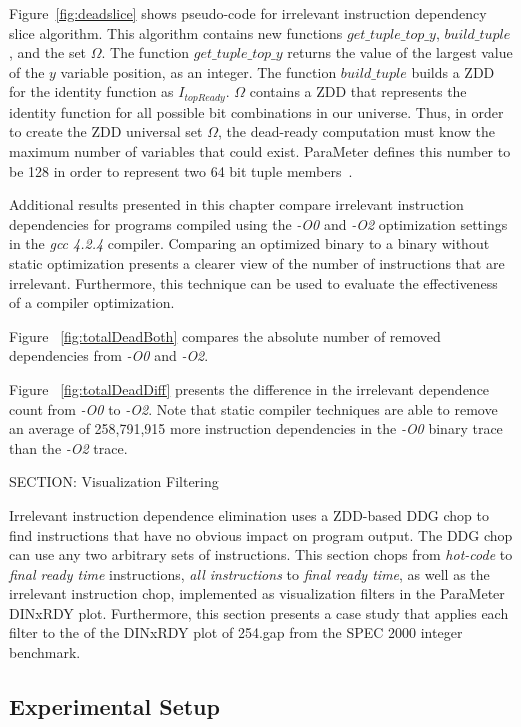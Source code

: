 {Figure~\ref{fig:deadslice} shows pseudo-code for irrelevant instruction dependency slice algorithm.  This algorithm contains new functions $get\_tuple\_top\_y$, $build\_tuple$, and the set $\Omega$. The function $get\_tuple\_top\_y$ returns the value of the largest value of the $y$ variable position, as an integer.  The function $build\_tuple$ builds a ZDD for the identity function as $I_{topReady}$.  $\Omega$ contains a ZDD that represents the identity function for all possible bit combinations in our universe.  Thus, in order to create the ZDD universal set $\Omega$, the dead-ready computation must know the maximum number of variables that could exist.  ParaMeter defines this number to be 128 in order to represent two 64 bit tuple members~\cite{price:10:cgo}.

Additional results presented in this chapter compare irrelevant instruction dependencies for programs compiled using the \textit{-O0} and \textit{-O2} optimization settings in the \textit{gcc 4.2.4} compiler.  Comparing an optimized binary to a binary without static optimization presents a clearer view of the number of instructions that are irrelevant.  Furthermore, this technique can be used to evaluate the effectiveness of a compiler optimization.

Figure ~\ref{fig:totalDeadBoth} compares the absolute number of removed dependencies from \textit{-O0} and \textit{-O2}.

Figure ~\ref{fig:totalDeadDiff} presents the difference in the irrelevant dependence count from \textit{-O0} to \textit{-O2}. Note that static compiler techniques are able to remove an average of 258,791,915 more instruction dependencies in the \textit{-O0} binary trace than the \textit{-O2} trace.

SECTION: Visualization Filtering


Irrelevant instruction dependence elimination uses a ZDD-based DDG chop to find instructions that have no obvious impact on program output.  The DDG chop can use any two arbitrary sets of instructions. This section chops from \textit{hot-code} to \textit{final ready time} instructions, \textit{all instructions} to \textit{final ready time}, as well as the irrelevant instruction chop, implemented as visualization filters in the ParaMeter DINxRDY plot. Furthermore, this section presents a case study that applies each filter to the of the DINxRDY plot of 254.gap from the SPEC 2000 integer benchmark.

\subsection {Experimental Setup}

}
